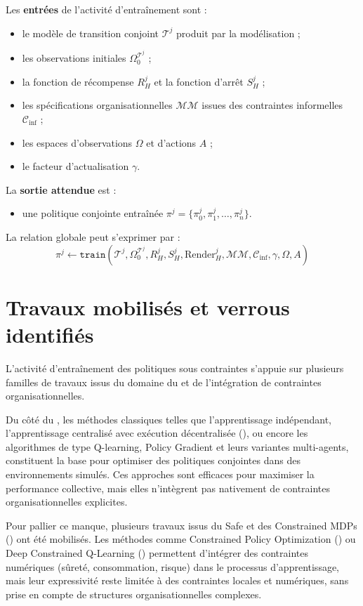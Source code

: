 Les \textbf{entrées} de l'activité d'entraînement sont :
\begin{itemize}
  \item le modèle de transition conjoint $\mathcal{T}^j$ produit par la modélisation ;
  \item les observations initiales $\Omega^{\mathcal{T}^j}_0$ ;
  \item la fonction de récompense $R^j_H$ et la fonction d'arrêt $S^j_H$ ;
  \item les spécifications organisationnelles $\mathcal{MM}$ issues des contraintes informelles $\mathcal{C}_{\text{inf}}$ ;
  \item les espaces d'observations $\Omega$ et d'actions $A$ ;
  \item le facteur d'actualisation $\gamma$.
\end{itemize}

La \textbf{sortie attendue} est :
\begin{itemize}
  \item une politique conjointe entraînée $\pi^j = \{\pi^j_0, \pi^j_1, \dots, \pi^j_n\}$.
\end{itemize}

\noindent La relation globale peut s'exprimer par :
\begin{displaymath}
  \pi^j \gets \texttt{train}(\mathcal{T}^j, \Omega^{\mathcal{T}^j}_0, R^j_H, S^j_H, \text{Render}^j_H, \mathcal{MM}, \mathcal{C}_{\text{inf}}, \gamma, \Omega, A)
\end{displaymath}
\section{Travaux mobilisés et verrous identifiés}

L'activité d'entraînement des politiques sous contraintes s'appuie sur plusieurs familles de travaux issus du domaine du  et de l'intégration de contraintes organisationnelles.

Du côté du , les méthodes classiques telles que l'apprentissage indépendant, l'apprentissage centralisé avec exécution décentralisée (), ou encore les algorithmes de type Q-learning, Policy Gradient et leurs variantes multi-agents, constituent la base pour optimiser des politiques conjointes dans des environnements simulés. Ces approches sont efficaces pour maximiser la performance collective, mais elles n'intègrent pas nativement de contraintes organisationnelles explicites.

Pour pallier ce manque, plusieurs travaux issus du Safe  et des Constrained MDPs () ont été mobilisés. Les méthodes comme Constrained Policy Optimization () ou Deep Constrained Q-Learning () permettent d'intégrer des contraintes numériques (sûreté, consommation, risque) dans le processus d'apprentissage, mais leur expressivité reste limitée à des contraintes locales et numériques, sans prise en compte de structures organisationnelles complexes.

